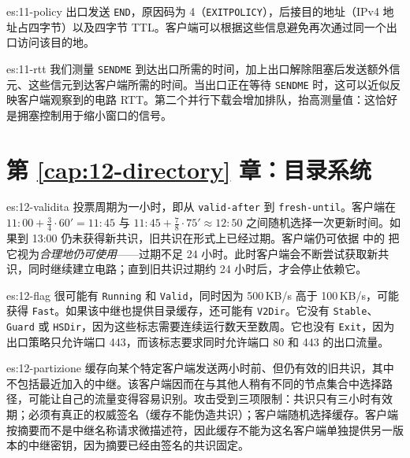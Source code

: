 \begin{soluzione}{es:11-policy}
出口发送 \texttt{END}，原因码为 4（\texttt{EXITPOLICY}），后接目的地址（IPv4 地址占四字节）以及四字节 TTL。客户端可以根据这些信息避免再次通过同一个出口访问该目的地。
\end{soluzione}

\begin{soluzione}{es:11-rtt}
我们测量 \texttt{SENDME} 到达出口所需的时间，加上出口解除阻塞后发送额外信元、这些信元到达客户端所需的时间。当出口正在等待 \texttt{SENDME} 时，这可以近似反映客户端观察到的电路 RTT。第二个并行下载会增加排队，抬高测量值：这恰好是拥塞控制用于缩小窗口的信号。
\end{soluzione}

\section*{第 \ref{cap:12-directory} 章：目录系统}

\begin{soluzione}{es:12-validita}
投票周期为一小时，即从 \texttt{valid-after} 到 \texttt{fresh-until}。客户端在 $11{:}00+\tfrac34\cdot60'=11{:}45$ 与 $11{:}45+\tfrac78\cdot75'\approx12{:}50$ 之间随机选择一次更新时间。如果到 13:00 仍未获得新共识，旧共识在形式上已经过期。客户端仍可依据  中的  把它视为\emph{合理地仍可使用}——过期不足 24 小时。此时客户端会不断尝试获取新共识，同时继续建立电路；直到旧共识过期约 24 小时后，才会停止依赖它。
\end{soluzione}

\begin{soluzione}{es:12-flag}
很可能有 \texttt{Running} 和 \texttt{Valid}，同时因为 500\,KB/s 高于 100\,KB/s，可能获得 \texttt{Fast}。如果该中继也提供目录缓存，还可能有 \texttt{V2Dir}。它没有 \texttt{Stable}、\texttt{Guard} 或 \texttt{HSDir}，因为这些标志需要连续运行数天至数周。它也没有 \texttt{Exit}，因为出口策略只允许端口 443，而该标志要求同时允许端口 80 和 443 的出口流量。
\end{soluzione}

\begin{soluzione}{es:12-partizione}
缓存向某个特定客户端发送两小时前、但仍有效的旧共识，其中不包括最近加入的中继。该客户端因而在与其他人稍有不同的节点集合中选择路径，可能让自己的流量变得容易识别。攻击受到三项限制：共识只有三小时有效期；必须有真正的权威签名（缓存不能伪造共识）；客户端随机选择缓存。客户端按摘要而不是中继名称请求微描述符，因此缓存不能为这名客户端单独提供另一版本的中继密钥，因为摘要已经由签名的共识固定。
\end{soluzione}

